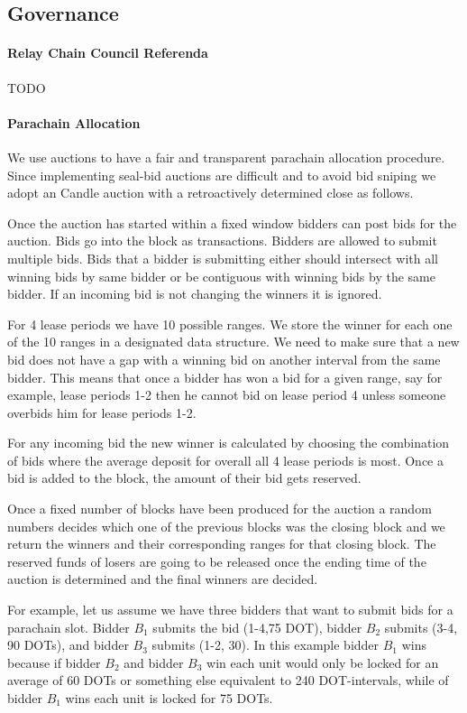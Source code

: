 \subsection{Governance}\label{sec:governance}
 \paragraph{Relay Chain Council Referenda}
 TODO
 \paragraph{Parachain Allocation}
We use auctions to have a fair and transparent parachain allocation procedure.
Since implementing seal-bid auctions are difficult and to avoid bid sniping we adopt an Candle auction \cite{Fuellbrunn:2012:CandleAuction} with a retroactively determined close as follows.

Once the auction has started within a fixed window bidders can post bids for the auction.
Bids go into the block as transactions.
Bidders are allowed to submit multiple bids.
Bids that a bidder is submitting either should intersect with all winning bids by same bidder or be contiguous with winning bids by the same bidder.
If an incoming bid is not changing the winners it is ignored.

For 4 lease periods we have 10 possible ranges.
We store the winner for each one of the 10 ranges in a designated data structure.
We need to make sure that a new bid does not have a gap with a winning bid on another interval from the same bidder.
This means that once a bidder has won a bid for a given range, say for example, lease periods 1-2 then he cannot bid on lease period 4 unless someone overbids him for lease periods 1-2.

For any incoming bid the new winner is calculated by choosing the combination of bids where the average deposit for overall all 4 lease periods is most.
Once a bid is added to the block, the amount of their bid gets reserved.

Once a fixed number of blocks have been produced for the auction a random numbers decides which one of the previous blocks was the closing block and we return the winners and their corresponding ranges for that closing block.
The reserved funds of losers are going to be released once the ending time of the auction is determined and the final winners are decided.

For example, let us assume we have three bidders that want to submit bids for a parachain slot.
Bidder $B_1$ submits the bid (1-4,75 DOT), bidder $B_2$ submits (3-4, 90 DOTs), and bidder $B_3$ submits (1-2, 30).
In this example bidder $B_1$ wins because if bidder $B_2$ and bidder $B_3$ win each unit would only be locked for an average of 60 DOTs or something else equivalent to 240 DOT-intervals, while of bidder $B_1$ wins each unit is locked for 75 DOTs.

